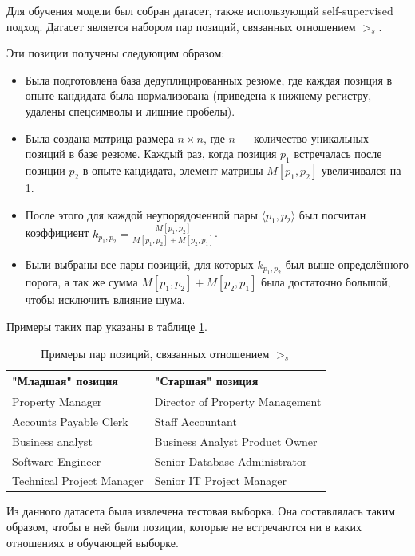 \documentclass[14pt]{mmcs_article}
\begin{document}
Для обучения модели был собран датасет, также использующий self-supervised подход. Датасет является набором пар позиций, связанных отношением $>_{s}$.

Эти позиции получены следующим образом:

\begin{itemize}
  \item Была подготовлена база дедуплицированных резюме, где каждая позиция в опыте кандидата была нормализована (приведена к нижнему регистру, удалены спецсимволы и лишние пробелы).
  \item Была создана матрица размера $n \times n$, где $n$ --- количество уникальных позиций в базе резюме. Каждый раз, когда позиция $p_1$ встречалась после позиции $p_2$ в опыте кандидата, элемент матрицы $M[p_1, p_2]$ увеличивался на 1.
  \item После этого для каждой неупорядоченной пары $\langle p_1, p_2 \rangle$ был посчитан коэффициент $k_{p_1, p_2} = \frac{M[p_1, p_2]}{M[p_1, p_2] + M[p_2, p_1]}$.
  \item Были выбраны все пары позиций, для которых $k_{p_1, p_2}$ был выше определённого порога, а так же сумма $M[p_1, p_2] + M[p_2, p_1]$ была достаточно большой, чтобы исключить влияние шума.
\end{itemize}

Примеры таких пар указаны в таблице \ref{tab:seniority_pairs}.

\begin{table}[H]
  \centering
  \caption{Примеры пар позиций, связанных отношением $>_{s}$}
  \label{tab:seniority_pairs}
  \begin{tabular}{|l|l|}
    \hline
    \textbf{"Младшая" позиция} & \textbf{"Старшая" позиция}      \\
    \hline
    Property Manager           & Director of Property Management \\
    \hline
    Accounts Payable Clerk     & Staff Accountant                \\
    \hline
    Business analyst           & Business Analyst Product Owner  \\
    \hline
    Software Engineer          & Senior Database Administrator   \\
    \hline
    Technical Project Manager  & Senior IT Project Manager       \\
    \hline
  \end{tabular}
\end{table}

Из данного датасета была извлечена тестовая выборка. Она составлялась таким образом, чтобы в ней были позиции, которые не встречаются ни в каких отношениях в обучающей выборке.
\end{document}

